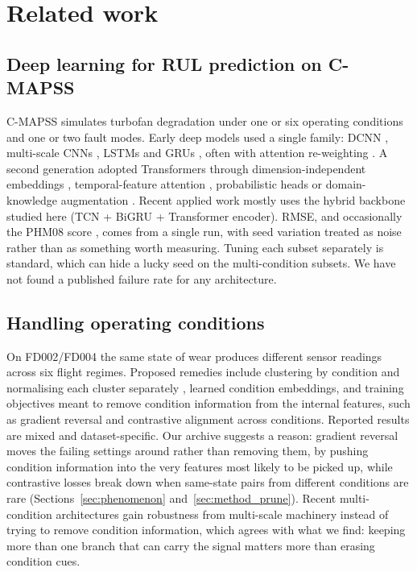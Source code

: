 \section{Related work}
\label{sec:related}

\subsection{Deep learning for RUL prediction on C-MAPSS}

C-MAPSS \cite{saxena2008damage} simulates turbofan degradation under one or
six operating conditions and one or two fault modes. Early deep models used a
single family: DCNN \cite{babu2016deep}, multi-scale CNNs
\cite{li2018remaining}, LSTMs and GRUs
\cite{zheng2017long,yuan2016fault,xiang2021multicellular}, often with
attention re-weighting \cite{zhang2022prediction,cnnlstmsam2019li}. A second
generation adopted Transformers \cite{vaswani2017attention} through
dimension-independent embeddings \cite{wang2024dvgtformer}, temporal-feature
attention \cite{zhang2024tatfa}, probabilistic heads
\cite{vaetransformer2022} or domain-knowledge augmentation
\cite{kim2025dkam}. Recent applied work mostly uses the hybrid backbone
studied here (TCN + BiGRU + Transformer encoder). RMSE, and occasionally the
PHM08 score \cite{saxena2008damage}, comes from a single run, with seed
variation treated as noise rather than as something worth measuring. Tuning
each subset separately is standard, which can hide a lucky seed on the
multi-condition subsets. We have not found a published failure rate for any
architecture.

\subsection{Handling operating conditions}

On FD002/FD004 the same state of wear produces different sensor readings
across six flight regimes. Proposed remedies include clustering by condition
and normalising each cluster separately \cite{liu2021clustering}, learned
condition embeddings, and training objectives meant to remove condition
information from the internal features, such as gradient reversal
\cite{ganin2016domain,ragab2022contrastive} and contrastive alignment across
conditions. Reported results are mixed and dataset-specific. Our archive
suggests a reason: gradient reversal moves the failing settings around
rather than removing them, by pushing condition information into the very
features most likely to be picked up, while contrastive losses break down
when same-state pairs from different conditions are rare
(Sections~\ref{sec:phenomenon} and~\ref{sec:method_prune}). Recent
multi-condition architectures \cite{kim2025dkam} gain robustness from
multi-scale machinery instead of trying to remove condition information,
which agrees with what we find: keeping more than one branch that can carry
the signal matters more than erasing condition cues.

